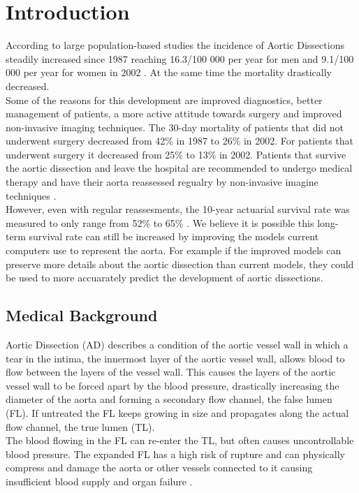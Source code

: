 \documentclass[thesis.tex]{subfiles}
\begin{document}
\chapter{Introduction}
\label{chap:introduction}


According to large population-based studies the incidence of Aortic Dissections steadily increased since 1987 reaching 16.3/100 000 per year for men and 9.1/100 000 per year for women in 2002 \cite{olsson2007thoracic}. At the same time the mortality drastically decreased. \\ Some of the reasons for this development are improved diagnostics, better management of patients, a more active attitude towards surgery and improved non-invasive imaging techniques.  
The 30-day mortality of patients that did not underwent surgery decreased from 42\% in 1987 to 26\% in 2002. For patients that underwent surgery it decreased from 25\% to 13\% in 2002. Patients that survive the aortic dissection and leave the hospital are recommended to undergo medical therapy and have their aorta reassessed regualry by non-invasive imagine techniques \cite{olsson2007thoracic,desanctis1987aortic,baliga2014role}. \\ However, even with regular reassesments, the 10-year actuarial survival rate was measured to only range from 52\% to 65\% \cite{olsson2007thoracic}. We believe it is possible this long-term survival rate can still be increased by improving the models current computers use to represent the aorta. For example if the improved models can preserve more details about the aortic dissection than current models, they could be used to more accuarately predict the development of aortic dissections.
\\


  
\section{Medical Background}
Aortic Dissection (AD) describes a condition of the aortic vessel wall in which a tear in the intima, the innermost layer of the aortic vessel wall, allows blood to flow between the layers of the vessel wall. This causes the layers of the aortic vessel wall to be forced apart by the blood pressure, drastically increasing the diameter of the aorta and forming a secondary flow channel, the false lumen (FL). If untreated the FL keeps growing in size and propagates along the actual flow channel, the true lumen (TL). \\
The blood flowing in the FL can re-enter the TL, but often causes uncontrollable blood pressure. The expanded FL has a high risk of rupture and can physically compress\cite{criado2011aortic} and damage the aorta or other vessels connected to it causing insufficient blood supply and organ failure \cite{meszaros2000epidemiology,desanctis1987aortic}. 
\end{document}
